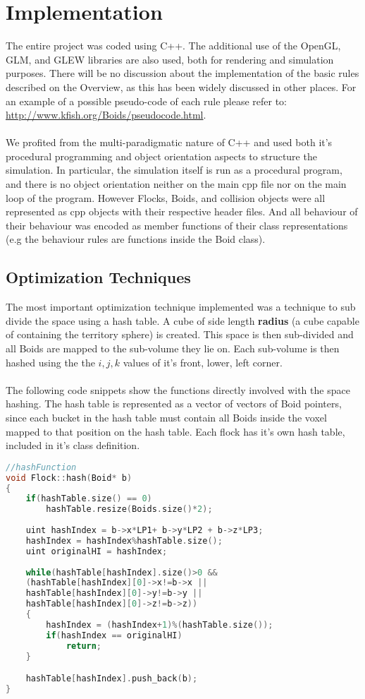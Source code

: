 \documentclass[12pt]{article}
\begin{document}
\section{Implementation}
The entire project was coded using C++. The additional use of the OpenGL, GLM, and GLEW libraries are also used, both for rendering and simulation purposes. There will be no discussion about the implementation of the basic rules described on the Overview, as this has been widely discussed in other places. For an example of a possible pseudo-code of each rule please refer to: \url{http://www.kfish.org/Boids/pseudocode.html}.
\\ \\
We profited from the multi-paradigmatic nature of C++ and used both it's procedural programming and object orientation aspects to structure the simulation. In particular, the simulation itself is run as a procedural program, and there is no object orientation neither on the main cpp file nor on the main loop of the program. However Flocks, Boids, and collision objects were all represented as cpp objects with their respective header files. And all behaviour of their behaviour was encoded as member functions of their class representations (e.g the behaviour rules are functions inside the Boid class). 

\subsection{Optimization Techniques}
The most important optimization technique implemented was a technique to sub divide the space using a hash table. A cube of side length \textbf{radius} (a cube capable of containing the territory sphere) is created. This space is then sub-divided and all Boids are mapped to the sub-volume they lie on. Each sub-volume is then hashed using the the $i,j,k$ values of it's front, lower, left corner.
\\ \\
\noindent The following code snippets show the functions directly involved with the space hashing. The hash table is represented as a vector of vectors of Boid pointers, since each bucket in the hash table must contain all Boids inside the voxel mapped to that position on the hash table. Each flock has it's own hash table, included in it's class definition.

\begin{minipage}[t]{\textwidth}
\begin{lstlisting}[language=C++]
//hashFunction
void Flock::hash(Boid* b)
{
	if(hashTable.size() == 0)
		hashTable.resize(Boids.size()*2);
	
	uint hashIndex = b->x*LP1+ b->y*LP2 + b->z*LP3;
	hashIndex = hashIndex%hashTable.size();
	uint originalHI = hashIndex;
	
	while(hashTable[hashIndex].size()>0 &&
	(hashTable[hashIndex][0]->x!=b->x ||
	hashTable[hashIndex][0]->y!=b->y ||
	hashTable[hashIndex][0]->z!=b->z))
	{
		hashIndex = (hashIndex+1)%(hashTable.size());
		if(hashIndex == originalHI)
			return;
	}

	hashTable[hashIndex].push_back(b);
}
\end{lstlisting}
\end{minipage}
\end{document}
